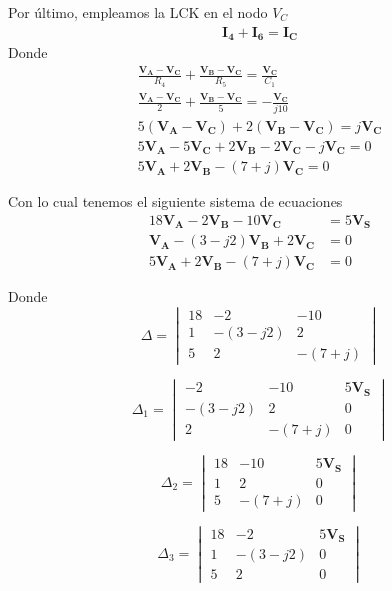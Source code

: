 \documentclass{article}
\begin{document}
	\noindent Por último, empleamos la LCK en el nodo $V_C$
	\begin{align}
		\bm{I_4} + \bm{I_6} = \bm{I_C}\nonumber
	\end{align}
	\noindent Donde
	\begin{align}
		\frac{\bm{V_A} - \bm{V_C}}{R_4} + \frac{\bm{V_B} - \bm{V_C}}{R_5} = \frac{\bm{V_C}}{C_1}\nonumber\\
		\frac{\bm{V_A} - \bm{V_C}}{2} + \frac{\bm{V_B} - \bm{V_C}}{5} = -\frac{\bm{V_C}}{j10}\nonumber\\
		5(\bm{V_A} - \bm{V_C}) + 2(\bm{V_B} - \bm{V_C}) = j\bm{V_C}\nonumber\\
		5\bm{V_A} - 5\bm{V_C} + 2\bm{V_B} - 2\bm{V_C} -  j\bm{V_C} =0\nonumber\\
		5\bm{V_A} + 2\bm{V_B} - (7 + j)\bm{V_C} =0
	\end{align}

	\noindent Con lo cual tenemos el siguiente sistema de ecuaciones
	\begin{align}
		18\bm{V_A} - 2\bm{V_B} - 10\bm{V_C} &= 5\bm{V_S}\nonumber\\
		\bm{V_A} - (3 - j2)\bm{V_B} + 2\bm{V_C} &= 0\nonumber\\
		5\bm{V_A} + 2\bm{V_B} - (7 + j)\bm{V_C} &=0\nonumber
	\end{align}

	\noindent Donde 
	\[
		\Delta = \begin{vmatrix}
			18 & -2 & -10 \\
			1 & -(3-j2) & 2 \\
			5 & 2  &-(7+j)
		\end{vmatrix}
	\]
	
	\[
	\Delta_1 = \begin{vmatrix}
		-2 & -10 & 5\bm{V_S} \\
		-(3-j2) & 2 & 0 \\
		2  &-(7+j) & 0
	\end{vmatrix}
	\]
	
	\[
	\Delta_2 = \begin{vmatrix}
		18 & -10 & 5\bm{V_S} \\
		1 & 2 & 0 \\
		5 &-(7+j) & 0
	\end{vmatrix}
	\]
	
	\[
	\Delta_3 = \begin{vmatrix}
		18 & -2 & 5\bm{V_S} \\
		1 & -(3-j2) & 0 \\
		5 & 2  & 0
	\end{vmatrix}
	\]
	
\end{document}
